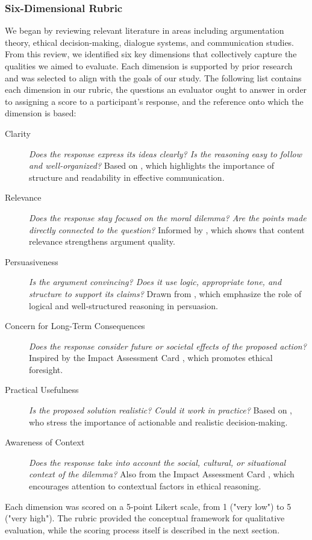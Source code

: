 \subsubsection{Six-Dimensional Rubric}
\label{sec:rubric}

We began by reviewing relevant literature in areas including argumentation theory, ethical decision-making, dialogue systems, and communication studies. From this review, we identified six key dimensions that collectively capture the qualities we aimed to evaluate. Each dimension is supported by prior research and was selected to align with the goals of our study.
The following list contains each dimension in our rubric, the questions an evaluator ought to answer in order to assigning a score to a participant's response, and the reference onto which the dimension is based:

\begin{description}
  \item[Clarity] \textit{Does the response express its ideas clearly? Is the reasoning easy to follow and well-organized?}
    Based on \citep{mctear2005spoken}, which highlights the importance of structure and readability in effective communication.
  \item[Relevance] \textit{Does the response stay focused on the moral dilemma? Are the points made directly connected to the question?}
    Informed by \citet{habernal2016argument}, which shows that content relevance strengthens argument quality.
  \item[Persuasiveness] \textit{Is the argument convincing? Does it use logic, appropriate tone, and structure to support its claims?}
    Drawn from \citet{johnson2006logical}, which emphasize the role of logical and well-structured reasoning in persuasion.
  \item[Concern for Long-Term Consequences] \textit{Does the response consider future or societal effects of the proposed action?}
    Inspired by the Impact Assessment Card \citep{impactassessment2018cscw}, which promotes ethical foresight.
  \item[Practical Usefulness] \textit{Is the proposed solution realistic? Could it work in practice?}
    Based on \citet{bazerman2012judgment}, who stress the importance of actionable and realistic decision-making.
  \item[Awareness of Context] \textit{Does the response take into account the social, cultural, or situational context of the dilemma?}
    Also from the Impact Assessment Card \citep{impactassessment2018cscw}, which encourages attention to contextual factors in ethical reasoning.
\end{description}

Each dimension was scored on a 5-point Likert scale, from 1 ("very low") to 5 ("very high"). The rubric provided the conceptual framework for qualitative evaluation, while the scoring process itself is described in the next section.
